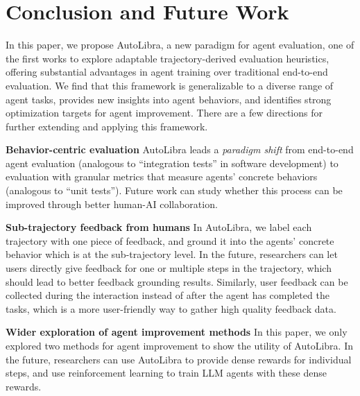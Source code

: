 \section{Conclusion and Future Work}
In this paper, we propose AutoLibra, a new paradigm for agent evaluation, one of the first works to explore adaptable trajectory-derived evaluation heuristics, offering substantial advantages in agent training over traditional end-to-end evaluation.
We find that this framework is generalizable to a diverse range of agent tasks, provides new insights into agent behaviors,
and identifies strong optimization targets for agent improvement. There are a few directions for further extending and applying this framework. 

\textbf{Behavior-centric evaluation} AutoLibra leads a \emph{paradigm shift} from end-to-end agent evaluation (analogous to ``integration tests'' in software development) to evaluation with granular metrics that measure agents' concrete behaviors (analogous to ``unit tests''). Future work can study whether this process can be improved through better human-AI collaboration.

\textbf{Sub-trajectory feedback from humans} In AutoLibra, we label each trajectory with one piece of feedback, and ground it into the agents' concrete behavior which is at the sub-trajectory level. In the future, researchers can let users directly give feedback for one or multiple steps in the trajectory, which should lead to better feedback grounding results. Similarly, user feedback can be collected during the interaction instead of after the agent has completed the tasks, which is a more user-friendly way to gather high quality feedback data.

\textbf{Wider exploration of  agent improvement methods} In this paper, we only explored two methods for agent improvement to show the utility of AutoLibra. In the future, researchers can use AutoLibra to provide dense rewards for individual steps, and use reinforcement learning to train LLM agents with these dense rewards. 
